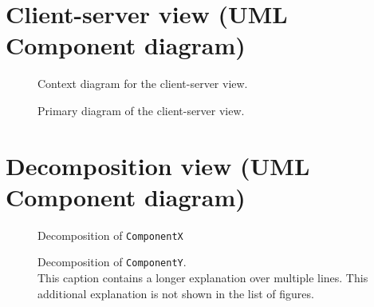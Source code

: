 \documentclass[english]{sareport}
\begin{document}
\chapter{Client-server view (UML Component diagram)}\label{sec:client-server}
\minilof

\showcsnotes{}


\begin{figure}[!htp]
	\centering
	\caption{Context diagram for the client-server view.
	}\label{fig:cc-context}
\end{figure}


\begin{figure}[!htp]
	\centering
	\caption{Primary diagram of the client-server view.}\label{fig:cs-primary}
\end{figure}


\clearpage
\chapter{Decomposition view (UML Component diagram)}\label{sec:decomposition}
\minilof

\showdecompnotes{}

\begin{figure}[!htp]
	\centering
	\caption{Decomposition of \texttt{ComponentX}}\label{fig:decomp-componentx}
\end{figure}

\begin{figure}[!htp]
	\centering
	\caption[Decomposition of \texttt{ComponentY}]{Decomposition of \texttt{ComponentY}.\\
	This caption contains a longer explanation over multiple lines. This additional explanation is not shown in the list of figures.}\label{fig:decomp-componenty}
\end{figure}
\end{document}
